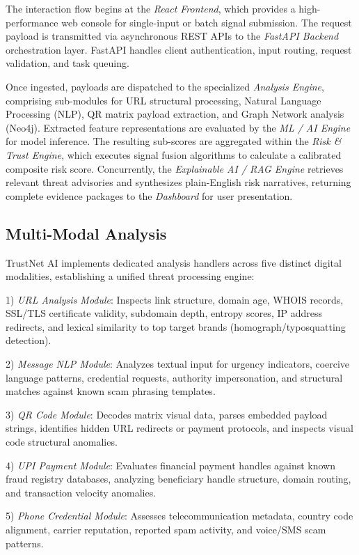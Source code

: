 \documentclass[conference,a4paper]{IEEEtran}
\begin{document}
The interaction flow begins at the \textit{React Frontend}, which provides a high-performance web console for single-input or batch signal submission. The request payload is transmitted via asynchronous REST APIs to the \textit{FastAPI Backend} orchestration layer. FastAPI handles client authentication, input routing, request validation, and task queuing.

Once ingested, payloads are dispatched to the specialized \textit{Analysis Engine}, comprising sub-modules for URL structural processing, Natural Language Processing (NLP), QR matrix payload extraction, and Graph Network analysis (Neo4j). Extracted feature representations are evaluated by the \textit{ML / AI Engine} for model inference. The resulting sub-scores are aggregated within the \textit{Risk \& Trust Engine}, which executes signal fusion algorithms to calculate a calibrated composite risk score. Concurrently, the \textit{Explainable AI / RAG Engine} retrieves relevant threat advisories and synthesizes plain-English risk narratives, returning complete evidence packages to the \textit{Dashboard} for user presentation.

\subsection{Multi-Modal Analysis}
TrustNet AI implements dedicated analysis handlers across five distinct digital modalities, establishing a unified threat processing engine:

1) \textit{URL Analysis Module}: Inspects link structure, domain age, WHOIS records, SSL/TLS certificate validity, subdomain depth, entropy scores, IP address redirects, and lexical similarity to top target brands (homograph/typosquatting detection).

2) \textit{Message NLP Module}: Analyzes textual input for urgency indicators, coercive language patterns, credential requests, authority impersonation, and structural matches against known scam phrasing templates.

3) \textit{QR Code Module}: Decodes matrix visual data, parses embedded payload strings, identifies hidden URL redirects or payment protocols, and inspects visual code structural anomalies.

4) \textit{UPI Payment Module}: Evaluates financial payment handles against known fraud registry databases, analyzing beneficiary handle structure, domain routing, and transaction velocity anomalies.

5) \textit{Phone Credential Module}: Assesses telecommunication metadata, country code alignment, carrier reputation, reported spam activity, and voice/SMS scam patterns.
\end{document}
